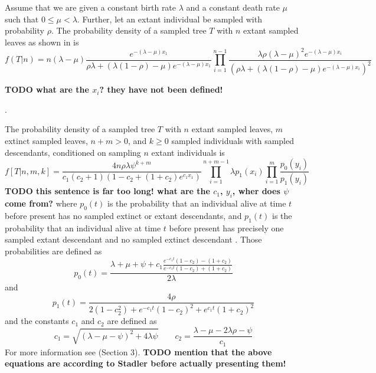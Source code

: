 \documentclass{llncs}
\begin{document}
Assume that we are given a constant birth rate $\lambda$ and a constant death rate $\mu$ such that
$0 \leq \mu < \lambda$. Further, let an extant individual be sampled with
probability $\rho$.  The probability density of a sampled tree $T$ with $n$
extant sampled leaves as shown in \citep{Stadler2010} is 
%
%
$$f(T|n) = n(\lambda-\mu)\frac{e^{-(\lambda-\mu)x_1}}{\rho\lambda + (\lambda(1 -\rho)-\mu)e^{-(\lambda-\mu)x_1}}\prod_{i=1}^{n-1}
\frac{\lambda\rho(\lambda-\mu)^2e^{-(\lambda-\mu)x_i}}{(\rho\lambda + (\lambda(1-\rho)-\mu)e^{-(\lambda-\mu)x_i})^2}$$
%
%

{\bf TODO what are the $x_i$? they have not been defined!} 

\citep[pg.~11][]{Stadler2010}.

The probability density of a sampled tree $T$ with $n$ extant sampled leaves,
$m$ extinct sampled leaves, $n+m > 0$, and $k \geq 0$ sampled individuals with
sampled descendants, conditioned on sampling $n$ extant individuals is
%
%
$$f[T|n,m,k] = \frac{4n\rho\lambda\psi^{k+m}}{c_1(c_2+1)(1-c_2+(1+c_2)e^{c_1x_1})}\prod_{i=1}^{n+m-1}\lambda p_1(x_i)\prod_{i=1}^{m}\frac{p_0(y_i)}{p_1(y_i)}$$
%
%
{\bf TODO this sentence is far too long! what are the $c_1$, $y_i$, wher does $\psi$ come from?} where $p_0(t)$ is the probability that an individual alive at time $t$ before
present has no sampled extinct or extant descendants, and $p_1(t)$ is the
probability that an individual alive at time $t$ before present has precisely
one sampled extant descendant and no sampled extinct descendant \citep[Eqn (9)][]{Stadler2010}. Those probabilities
are defined as
%
$$p_0(t) = \frac{\lambda+\mu+\psi+c_1\frac{e^{-c_1 t}(1-c_2)-(1+c_2)}{e^{-c_1t}(1-c_2)+(1+c_2)}}{2\lambda}$$
and
$$p_1(t) = \frac{4\rho}{2(1-c_2^2)+e^{-c_1t}(1-c_2)^2+e^{c_1t}(1+c_2)^2}$$
%
and the constants $c_1$ and $c_2$ are defined as
%
$$c_1 = \sqrt{(\lambda-\mu-\psi)^2 + 4\lambda\psi} \qquad c_2 = \frac{\lambda-\mu-2\lambda\rho-\psi}{c_1}$$
%
For more information see \citep{Stadler2010} (Section 3).
{\bf TODO mention that the above equations are according to Stadler before actually presenting them!} 
\end{document}
